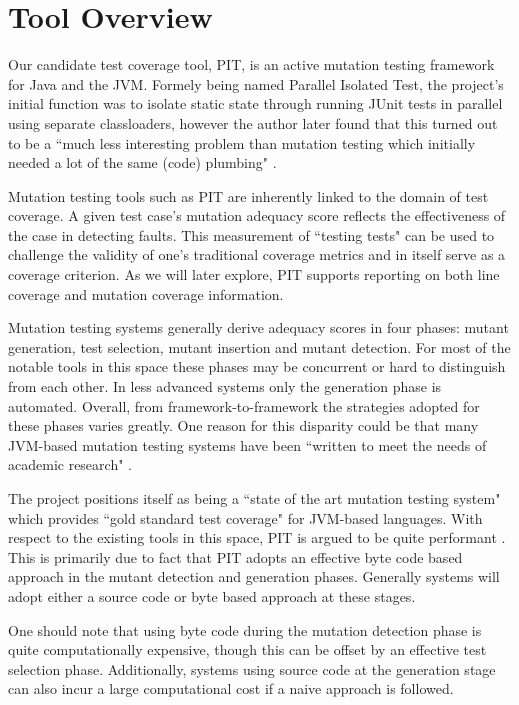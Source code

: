 \documentclass[a4paper]{article}
\begin{document}
\section{Tool Overview}
Our candidate test coverage tool, PIT, is an active mutation testing framework for Java and the JVM. Formely being named Parallel Isolated Test, the project's initial function was to isolate static state through running JUnit tests in parallel using separate classloaders, however the author later found that this turned out to be a ``much less interesting problem than mutation testing which initially needed a lot of the same (code) plumbing" \citep{Coles}. 
\par
Mutation testing tools such as PIT are inherently linked to the domain of test coverage. A given test case's mutation adequacy score reflects the effectiveness of the case in detecting faults. This measurement of ``testing tests" can be used to challenge the validity of one's traditional coverage metrics and in itself serve as a coverage criterion. As we will later explore, PIT supports reporting on both line coverage and mutation coverage information.
\par
Mutation testing systems generally derive adequacy scores in four phases: mutant generation, test selection, mutant insertion and mutant detection. For most of the notable tools in this space these phases may be concurrent or hard to distinguish from each other. In less advanced systems only the generation phase is automated. Overall, from framework-to-framework the strategies adopted for these phases varies greatly. One reason for this disparity could be that many JVM-based mutation testing systems have been ``written to meet the needs of academic research" \citep{Coles}. 
\par
The project positions itself as being a ``state of the art mutation testing system" which provides ``gold standard test coverage" for JVM-based languages. With respect to the existing tools in this space, PIT is argued to be quite performant \citep{Laenen, Coles}. This is primarily due to fact that PIT adopts an effective byte code based approach in the mutant detection and generation phases. Generally systems will adopt either a source code or byte based approach at these stages. 
\par
One should note that using byte code during the mutation detection phase is quite computationally expensive, though this can be offset by an effective test selection phase. Additionally, systems using source code at the generation stage can also incur a large computational cost if a naive approach is followed.
\end{document}
